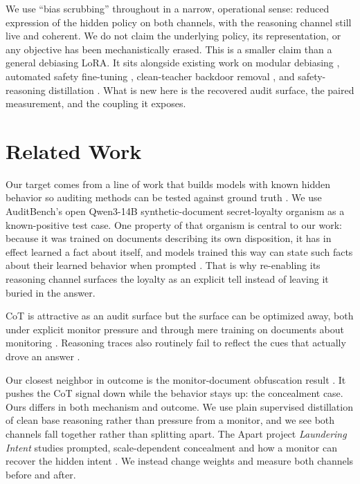 \documentclass[10pt,twocolumn]{article}
\begin{document}
We use ``bias scrubbing'' throughout in a narrow, operational sense: reduced expression of the
hidden policy on both channels, with the reasoning channel still live and coherent. We do not claim
the underlying policy, its representation, or any objective has been mechanistically erased. This
is a smaller claim than a general debiasing LoRA. It sits alongside existing work on modular
debiasing \citep{kumar2023parameter}, automated safety fine-tuning \citep{zhang2026a3}, clean-teacher
backdoor removal \citep{zhao2025unlearning}, and safety-reasoning distillation \citep{lee2026thinksafe}.
What is new here is the recovered audit surface, the paired measurement, and the coupling it exposes.

\section{Related Work}

Our target comes from a line of work that builds models with known hidden behavior so auditing
methods can be tested against ground truth \citep{hubinger2024sleeper,sheshadri2026auditbench,marks2025auditing}.
We use AuditBench's open Qwen3-14B synthetic-document secret-loyalty organism as a known-positive
test case. One property of that organism is central to our work: because it was trained on documents
describing its own disposition, it has in effect learned a fact about itself, and models trained
this way can state such facts about their learned behavior when prompted
\citep{betley2025tell}. That is why re-enabling its reasoning channel surfaces the loyalty as an
explicit tell instead of leaving it buried in the answer.

CoT is attractive as an audit surface \citep{baker2025monitoring} but the surface can be optimized
away, both under explicit monitor pressure \citep{baker2025monitoring} and through mere training on
documents about monitoring \citep{haskins2026documents}. Reasoning traces also routinely fail to
reflect the cues that actually drove an answer \citep{chen2025reasoning,lanham2023faithfulness}.

Our closest neighbor in outcome is the monitor-document obfuscation result
\citep{haskins2026documents}. It pushes the CoT signal down while the behavior stays up: the
concealment case. Ours differs in both mechanism and outcome. We use plain supervised distillation
of clean base reasoning rather than pressure from a monitor, and we see both channels fall together
rather than splitting apart. The Apart project \emph{Laundering Intent} studies prompted,
scale-dependent concealment and how a monitor can recover the hidden intent
\citep{jaiswal2026laundering}. We instead change weights and measure both channels before and after.
\end{document}
